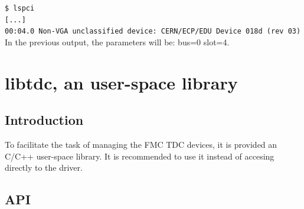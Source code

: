 \documentclass[a4paper,11pt]{article}
\begin{document}
\indent\indent\texttt{\$ lspci} \\
\indent\indent\texttt{[...]} \\
\indent\indent\texttt{00:04.0 Non-VGA unclassified device: CERN/ECP/EDU Device 018d (rev 03)} \\
In the previous output, the parameters will be: bus=0 slot=4.


\section{libtdc, an user-space library}

\subsection{Introduction}

To facilitate the task of managing the FMC TDC devices, it is provided an C/C++
user-space library. It is recommended to use it instead of accesing directly to
the driver.

\subsection{API}
\end{document}
